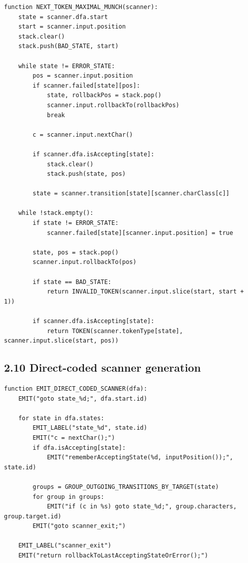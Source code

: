 \documentclass[10pt,letterpaper]{article}
\begin{document}
\begin{verbatim}
function NEXT_TOKEN_MAXIMAL_MUNCH(scanner):
    state = scanner.dfa.start
    start = scanner.input.position
    stack.clear()
    stack.push(BAD_STATE, start)

    while state != ERROR_STATE:
        pos = scanner.input.position
        if scanner.failed[state][pos]:
            state, rollbackPos = stack.pop()
            scanner.input.rollbackTo(rollbackPos)
            break

        c = scanner.input.nextChar()

        if scanner.dfa.isAccepting[state]:
            stack.clear()
            stack.push(state, pos)

        state = scanner.transition[state][scanner.charClass[c]]

    while !stack.empty():
        if state != ERROR_STATE:
            scanner.failed[state][scanner.input.position] = true

        state, pos = stack.pop()
        scanner.input.rollbackTo(pos)

        if state == BAD_STATE:
            return INVALID_TOKEN(scanner.input.slice(start, start + 1))

        if scanner.dfa.isAccepting[state]:
            return TOKEN(scanner.tokenType[state], scanner.input.slice(start, pos))
\end{verbatim}

\subsection*{2.10 Direct-coded scanner generation}

\begin{verbatim}
function EMIT_DIRECT_CODED_SCANNER(dfa):
    EMIT("goto state_%d;", dfa.start.id)

    for state in dfa.states:
        EMIT_LABEL("state_%d", state.id)
        EMIT("c = nextChar();")
        if dfa.isAccepting[state]:
            EMIT("rememberAcceptingState(%d, inputPosition());", state.id)

        groups = GROUP_OUTGOING_TRANSITIONS_BY_TARGET(state)
        for group in groups:
            EMIT("if (c in %s) goto state_%d;", group.characters, group.target.id)
        EMIT("goto scanner_exit;")

    EMIT_LABEL("scanner_exit")
    EMIT("return rollbackToLastAcceptingStateOrError();")
\end{verbatim}
\end{document}
